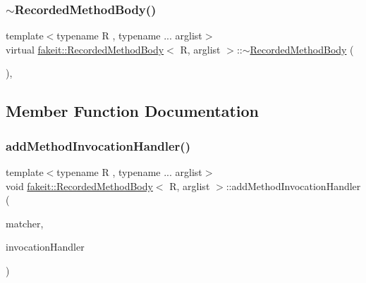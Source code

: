 \subsubsection{\texorpdfstring{$\sim$RecordedMethodBody()}{~RecordedMethodBody()}\hspace{0.1cm}{\footnotesize\ttfamily [9/9]}}
{\footnotesize\ttfamily template$<$typename R , typename ... arglist$>$ \\
virtual \mbox{\hyperlink{classfakeit_1_1RecordedMethodBody}{fakeit\+::\+Recorded\+Method\+Body}}$<$ R, arglist $>$\+::$\sim$\mbox{\hyperlink{classfakeit_1_1RecordedMethodBody}{Recorded\+Method\+Body}} (\begin{DoxyParamCaption}{ }\end{DoxyParamCaption})\hspace{0.3cm}{\ttfamily [inline]}, {\ttfamily [virtual]}}



\subsection{Member Function Documentation}
\mbox{\label{classfakeit_1_1RecordedMethodBody_a41c27f1eafd04235bb736c2f60b636fa}} 
\subsubsection{\texorpdfstring{addMethodInvocationHandler()}{addMethodInvocationHandler()}\hspace{0.1cm}{\footnotesize\ttfamily [1/9]}}
{\footnotesize\ttfamily template$<$typename R , typename ... arglist$>$ \\
void \mbox{\hyperlink{classfakeit_1_1RecordedMethodBody}{fakeit\+::\+Recorded\+Method\+Body}}$<$ R, arglist $>$\+::add\+Method\+Invocation\+Handler (\begin{DoxyParamCaption}\item[{typename \mbox{\hyperlink{structfakeit_1_1ActualInvocation}{Actual\+Invocation}}$<$ arglist... $>$\+::Matcher $\ast$}]{matcher,  }\item[{\mbox{\hyperlink{structfakeit_1_1ActualInvocationHandler}{Actual\+Invocation\+Handler}}$<$ R, arglist... $>$ $\ast$}]{invocation\+Handler }\end{DoxyParamCaption})\hspace{0.3cm}{\ttfamily [inline]}}

